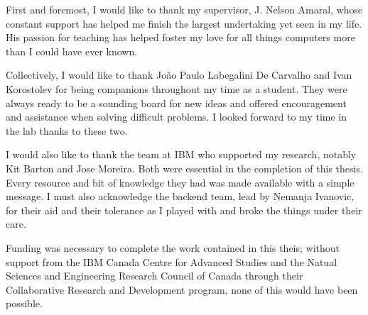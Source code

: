 \documentclass[\main/thesis.tex]{subfiles}
\begin{document}
\begin{acknowledgements}
  First and foremost, I would like to thank my supervisor, J. Nelson Amaral, whose constant support has helped me finish the largest undertaking yet seen in my life.
  His passion for teaching has helped foster my love for all things computers more than I could have ever known.

  Collectively, I would like to thank Jo\~ao Paulo Labegalini De Carvalho and Ivan Korostolev for being companions throughout my time as a student.
  They were always ready to be a sounding board for new ideas and offered encouragement and assistance when solving difficult problems.
  I looked forward to my time in the lab thanks to these two.

  I would also like to thank the team at IBM who supported my research, notably Kit Barton and Jose Moreira.
  Both were essential in the completion of this thesis.
  Every resource and bit of knowledge they had was made available with a simple message.
  I must also acknowledge the backend team, lead by Nemanja Ivanovic, for their aid and their tolerance as I played with and broke the things under their care.

  Funding was necessary to complete the work contained in this theis; without support from the IBM Canada Centre for Advanced Studies and the Natual Sciences and Engineering Research Council of Canada through their Collaborative Research and Development program, none of this would have been possible.
\end{acknowledgements}
\end{document}
